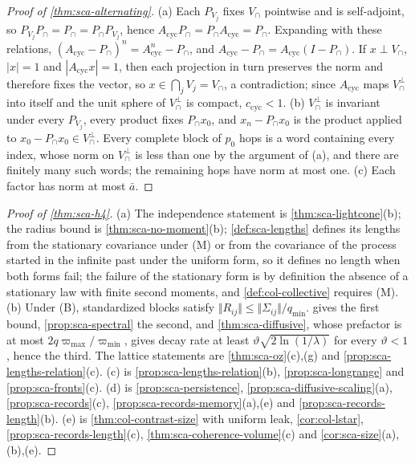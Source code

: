 \begin{proof}[Proof of \cref{thm:sca-alternating}]
(a) Each $P_{V_j}$ fixes $V_\cap$ pointwise and is self-adjoint, so $P_{V_j}P_\cap=P_\cap=P_\cap P_{V_j}$, hence $A_{\mathrm{cyc}}P_\cap=P_\cap A_{\mathrm{cyc}}=P_\cap$. Expanding with these relations, $(A_{\mathrm{cyc}}-P_\cap)^n=A_{\mathrm{cyc}}^n-P_\cap$, and $A_{\mathrm{cyc}}-P_\cap=A_{\mathrm{cyc}}(I-P_\cap)$. If $x\perp V_\cap$, $|x|=1$ and $|A_{\mathrm{cyc}}x|=1$, then each projection in turn preserves the norm and therefore fixes the vector, so $x\in\bigcap_jV_j=V_\cap$, a contradiction; since $A_{\mathrm{cyc}}$ maps $V_\cap^\perp$ into itself and the unit sphere of $V_\cap^\perp$ is compact, $c_{\mathrm{cyc}}<1$. (b) $V_\cap^\perp$ is invariant under every $P_{V_j}$, every product fixes $P_\cap x_0$, and $x_n-P_\cap x_0$ is the product applied to $x_0-P_\cap x_0\in V_\cap^\perp$. Every complete block of $p_0$ hops is a word containing every index, whose norm on $V_\cap^\perp$ is less than one by the argument of (a), and there are finitely many such words; the remaining hops have norm at most one. (c) Each factor has norm at most $\bar a$.
\end{proof}

\begin{proof}[Proof of \cref{thm:sca-h4}]
(a) The independence statement is \cref{thm:sca-lightcone}(b); the radius bound is \cref{thm:sca-no-moment}(b); \cref{def:sca-lengths} defines its lengths from the stationary covariance under \textup{(M)} or from the covariance of the process started in the infinite past under the uniform form, so it defines no length when both forms fail; the failure of the stationary form is by definition the absence of a stationary law with finite second moments, and \cref{def:col-collective} requires \textup{(M)}. (b) Under \textup{(B)}, standardized blocks satisfy $\Vert R_{ij}\Vert\le\Vert\Sigma_{ij}\Vert/q_{\min}$.  gives the first bound, \cref{prop:sca-spectral} the second, and \cref{thm:sca-diffusive}, whose prefactor is at most $2q\varpi_{\max}/\varpi_{\min}$, gives decay rate at least $\vartheta\sqrt{2\ln(1/\lambda)}$ for every $\vartheta<1$, hence the third. The lattice statements are \cref{thm:sca-oz}(c),(g) and \cref{prop:sca-lengths-relation}(c). (c) is \cref{prop:sca-lengths-relation}(b), \cref{prop:sca-longrange} and \cref{prop:sca-fronts}(c). (d) is \cref{prop:sca-persistence}, \cref{prop:sca-diffusive-scaling}(a), \cref{prop:sca-records}(c), \cref{prop:sca-records-memory}(a),(e) and \cref{prop:sca-records-length}(b). (e) is \cref{thm:col-contrast-size} with uniform leak, \cref{cor:col-lstar}, \cref{prop:sca-records-length}(c), \cref{thm:sca-coherence-volume}(c) and \cref{cor:sca-size}(a),(b),(e).
\end{proof}
